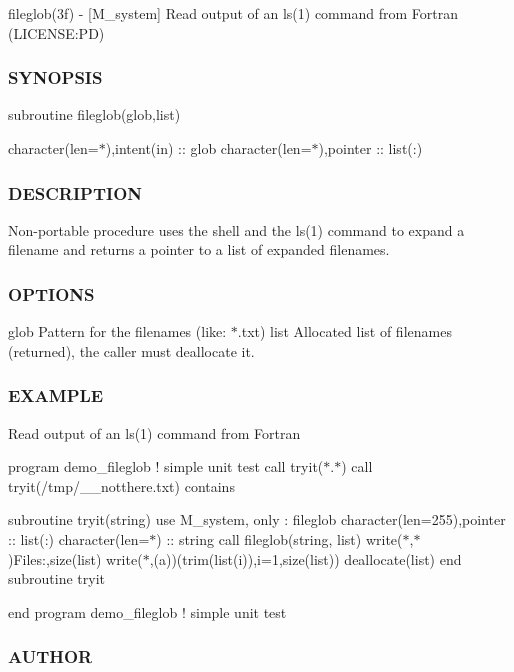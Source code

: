 fileglob(3f) -\/ \mbox{[}M\+\_\+system\mbox{]} Read output of an ls(1) command from Fortran (L\+I\+C\+E\+N\+SE\+:PD) 

\subsubsection*{S\+Y\+N\+O\+P\+S\+IS}

subroutine fileglob(glob,list)

character(len=$\ast$),intent(in) \+:\+: glob character(len=$\ast$),pointer \+:\+: list(\+:)

\subsubsection*{D\+E\+S\+C\+R\+I\+P\+T\+I\+ON}

Non-\/portable procedure uses the shell and the ls(1) command to expand a filename and returns a pointer to a list of expanded filenames.

\subsubsection*{O\+P\+T\+I\+O\+NS}

glob Pattern for the filenames (like\+: $\ast$.txt) list Allocated list of filenames (returned), the caller must deallocate it.

\subsubsection*{E\+X\+A\+M\+P\+LE}

Read output of an ls(1) command from Fortran

program demo\+\_\+fileglob ! simple unit test call tryit(\textquotesingle{}$\ast$.$\ast$\textquotesingle{}) call tryit(\textquotesingle{}/tmp/\+\_\+\+\_\+notthere.txt\textquotesingle{}) contains

subroutine tryit(string) use M\+\_\+system, only \+: fileglob character(len=255),pointer \+:\+: list(\+:) character(len=$\ast$) \+:\+: string call fileglob(string, list) write($\ast$,$\ast$)\textquotesingle{}Files\+:\textquotesingle{},size(list) write($\ast$,\textquotesingle{}(a)\textquotesingle{})(trim(list(i)),i=1,size(list)) deallocate(list) end subroutine tryit

end program demo\+\_\+fileglob ! simple unit test

\subsubsection*{A\+U\+T\+H\+OR}

